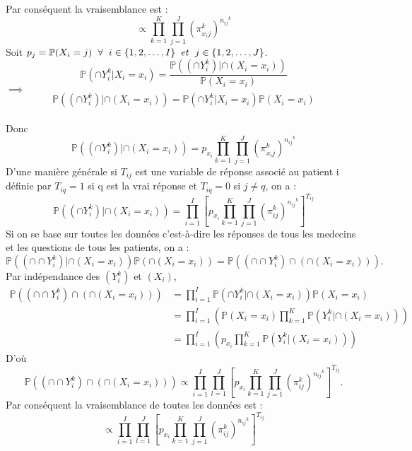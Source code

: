 \documentclass[a4paper,french,10pt]{article}
\begin{document}
	Par conséquent la vraisemblance est : \[\propto \prod_{k=1}^{K} \prod_{j=1}^{J} \left(\pi_{x_ij}^k\right)^{{n_{ij}}^{k}}\]
	Soit $p_j = \mathbb{P}(X_i = j) \hspace{2mm}\forall\hspace{2mm}i \in \{1, 2, \dots,I\}\hspace{2mm} et\hspace{2mm} j \in \{1, 2, \dots,J\}$.
	\[\mathbb{P} (\cap Y_{i}^k | X_i=x_i ) = \frac{\mathbb{P} \left((\cap Y_{i}^k) | \cap(X_i=x_i) \right)}{\mathbb{P}(X_i = x_i)}\] $\implies$ \[\mathbb{P} \left((\cap Y_{i}^k) | \cap(X_i=x_i) \right) = \mathbb{P} (\cap Y_{i}^k | X_i=x_i ) \mathbb{P}(X_i = x_i)\]\\
	Donc \[\mathbb{P} \left((\cap Y_{i}^k) | \cap(X_i=x_i) \right) = p_{x_{i}} \prod_{k=1}^{K} \prod_{j=1}^{J} \left(\pi_{x_ij}^k\right)^{{n_{ij}}^{k}}\]
	D'une manière générale si $T_{ij}$ est une variable de réponse associé au patient i définie par $T_{iq} = 1$  si q est la vrai réponse et $T_{iq} = 0$ si $j \neq q$, on a :
	\[\mathbb{P} \left((\cap Y_{i}^k) | \cap(X_i=x_i) \right) = \prod_{i=1}^{I}\left[p_{x_i} \prod_{k=1}^{K} \prod_{j=1}^{J} \left(\pi_{ij}^k\right)^{{n_{ij}}^{k}}\right]^{T_{ij}}\]
	Si on se base sur toutes les données c'est-à-dire les réponses de tous les medecins et les questions de tous les patients, on a :
	\[\mathbb{P} \left((\cap \cap Y_{i}^k) | \cap(X_i=x_i) \right) \mathbb{P}\left(\cap (X_i = x_i)\right) = \mathbb{P} \left((\cap \cap Y_{i}^k) \cap \left(\cap(X_i=x_i)\right)  \right).\]
	Par indépendance des $(Y_{i}^k)$ et $(X_i)$, 
	\begin{align*}
		\mathbb{P} \left((\cap \cap Y_{i}^k) \cap \left(\cap(X_i=x_i)\right)  \right) &= \prod_{i=1}^{I} \mathbb{P} \left(\cap Y_{i}^k | \cap (X_i=x_i)\right) \mathbb{P}(X_i = x_i)\\
		 &= \prod_{i=1}^{I}\left(\mathbb{P}(X_i = x_i) \prod_{k=1}^{K}\mathbb{P} \left( Y_{i}^k | \cap(X_i=x_i) \right)\right) \\
		 &= \prod_{i=1}^{I}\left(p_{x_i} \prod_{k=1}^{K}\mathbb{P} \left( Y_{i}^k | (X_i=x_i) \right)\right)
	\end{align*}
D'où \[\mathbb{P} \left((\cap \cap Y_{i}^k) \cap \left(\cap(X_i=x_i)\right)  \right) \propto \prod_{i=1}^{I}\prod_{l=1}^{J}\left[p_{x_i} \prod_{k=1}^{K} \prod_{j=1}^{J} \left(\pi_{ij}^k\right)^{{n_{ij}}^{k}}\right]^{T_{ij}}.\]
Par conséquent la vraisemblance de toutes les données est :
\[\propto \prod_{i=1}^{I}\prod_{l=1}^{J}\left[p_{x_i} \prod_{k=1}^{K} \prod_{j=1}^{J} \left(\pi_{ij}^k\right)^{{n_{ij}}^{k}}\right]^{T_{ij}}\]
	
\end{document}
